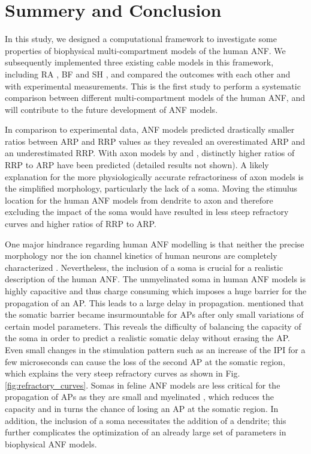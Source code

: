 \documentclass[utf8]{frontiersSCNS} %
\begin{document}
\section{Summery and Conclusion}
\label{sec:discussion}

In this study, we designed a computational framework to investigate some properties of biophysical multi-compartment models of the human ANF. We subsequently implemented three existing cable models in this framework, including RA \cite{Rattay2001}, BF \cite{Briaire2005} and SH \cite{Smit2010}, and compared the outcomes with each other and with experimental measurements. This is the first study to perform a systematic comparison between different multi-compartment models of the human ANF, and will contribute to the future development of ANF models.

In comparison to experimental data, ANF models predicted drastically smaller ratios between ARP and RRP values as they revealed an overestimated ARP and an underestimated RRP. With axon models by \cite{Frijns1994} and \cite{Imennov2009}, distinctly higher ratios of RRP to ARP have been predicted (detailed results not shown). A likely explanation for the more physiologically accurate refractoriness of axon models is the simplified morphology, particularly the lack of a soma. Moving the stimulus location for the human ANF models from dendrite to axon and therefore excluding the impact of the soma would have resulted in less steep refractory curves and higher ratios of RRP to ARP.

One major hindrance regarding human ANF modelling is that neither the precise morphology nor the ion channel kinetics of human neurons are completely characterized \citep{OBrien2016}.
Nevertheless, the inclusion of a soma is crucial for a realistic description of the human ANF.
The unmyelinated soma in human ANF models is highly capacitive and thus charge consuming which imposes a huge barrier for the propagation of an AP. This leads to a large delay in propagation. \cite{Rattay2001} mentioned that the somatic barrier became insurmountable for APs after only small variations of certain model parameters. This reveals the difficulty of balancing the capacity of the soma in order to predict a realistic somatic delay without erasing the AP. Even small changes in the stimulation pattern such as an increase of the IPI for a few microseconds can cause the loss of the second AP at the somatic region, which explains the very steep refractory curves as shown in Fig. \ref{fig:refractory_curves}. Somas in feline ANF models are less critical for the propagation of APs as they are small and myelinated \citep{Liberman1984}, which reduces the capacity and in turns the chance of losing an AP at the somatic region.
In addition, the inclusion of a soma necessitates the addition of a dendrite; this further complicates the optimization of an already large set of parameters in biophysical ANF models.
\end{document}
